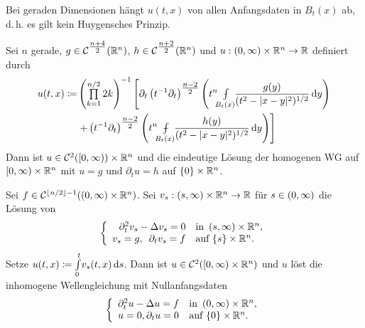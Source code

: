 \documentclass{cheat-sheet}
\def\Xint#1{\mathchoice
   {\XXint\displaystyle\textstyle{#1}}%
   {\XXint\textstyle\scriptstyle{#1}}%
   {\XXint\scriptstyle\scriptscriptstyle{#1}}%
   {\XXint\scriptscriptstyle\scriptscriptstyle{#1}}%
   \!\int}
\def\XXint#1#2#3{{\setbox0=\hbox{$#1{#2#3}{\int}$}
     \vcenter{\hbox{$#2#3$}}\kern-.5\wd0}}
\def\dashint{\Xint-}
\newcommand{\mymvint}[2]{{\textstyle \dashint\limits_{#1}^{#2}}}
\newcommand{\MVInt}[4]{\mymvint{#1}{#2} #3 \,\d #4}
\begin{document}
\begin{bem}
  Bei geraden Dimensionen hängt $u(t, x)$ von allen Anfangsdaten in $B_t(x)$ ab, d.\,h. es gilt kein Huygensches Prinzip.
\end{bem}

\begin{satz}
  Sei $n$ gerade, $g \in \mathcal{C}^{\tfrac{n+4}{2}}(\mathbb{R}^n)$, $h \in \mathcal{C}^{\tfrac{n+2}{2}}(\mathbb{R}^n)$ und $u : \left( 0, \infty \right) \times \mathbb{R}^n \to \mathbb{R}$ definiert durch
  \begin{align*}
    u(t, x) \coloneqq & \left( \prod_{k=1}^{n/2} 2k \right)^{-1} \left[ \partial_t \left( t^{-1} \partial_t \right)^{\tfrac{n-2}{2}} \left( t^n \enspace \MVInt{\mathclap{B_t(x)}}{}{\enspace \frac{g(y)}{(t^2 - \abs{x-y}^2)^{1/2}}}{y} \right) \right. \\
    & \left. + \left( t^{-1} \partial_t \right)^{\tfrac{n-2}{2}} \left( t^n \enspace \MVInt{\mathclap{B_t(x)}}{}{ \enspace \frac{h(y)}{(t^2 - \abs{x-y}^2)^{1/2}}}{y} \right) \right]
  \end{align*}
  Dann ist $u \in \mathcal{C}^2(\left[ 0, \infty \right)) \times \mathbb{R}^n$ und die eindeutige Lösung der homogenen WG auf $\left[ 0, \infty \right) \times \mathbb{R}^n$ mit $u = g$ und $\partial_t u = h$ auf $\{ 0 \} \times \mathbb{R}^n$.
\end{satz}


\begin{satz}
  Sei $f \in \mathcal{C}^{\lfloor n/2 \rfloor - 1}(\left( 0, \infty \right) \times \mathbb{R}^n)$. Sei $v_s : \left( s, \infty \right) \times \mathbb{R}^n \to \mathbb{R}$ für $s \in \left( 0, \infty \right)$ die Lösung von
  \[
    \left\{ \begin{array}{rlll}
      \partial_t^2 v_s - \Delta v_s = 0 & \text{in } \left( s, \infty \right) \times \mathbb{R}^n, \\
      v_s = g, \enspace \partial_t v_s = f & \text{auf } \{ s \} \times \mathbb{R}^n.
    \end{array} \right.
  \]
  Setze $u(t, x) \coloneqq {\textstyle \int\limits_{0}^{t}} v_s(t, x) \,\mathrm{d} s$. Dann ist $u \in \mathcal{C}^2(\left[ 0, \infty \right) \times \mathbb{R}^n)$ und $u$ löst die inhomogene Wellengleichung mit Nullanfangsdaten
  \[
    \left\{ \begin{array}{ll}
      \partial_t^2 u - \Delta u = f & \text{in } \left( 0, \infty \right) \times \mathbb{R}^n, \\
      u = 0, \partial_t u = 0 & \text{auf } \{ 0 \} \times \mathbb{R}^n.
    \end{array} \right.
  \]
\end{satz}
\end{document}
